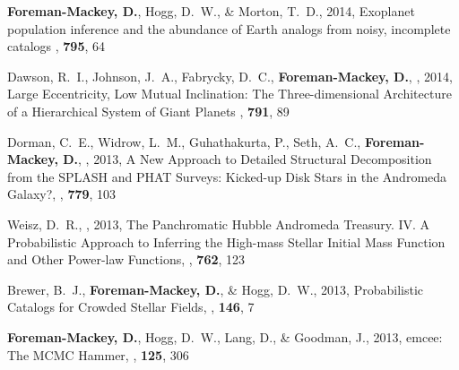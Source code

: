 \item {\bf Foreman-Mackey, D.}, Hogg, D.~W., \& Morton, T.~D., 2014,
        {Exoplanet population inference and the abundance of Earth analogs
         from noisy, incomplete catalogs}
    \apj, \textbf{795}, 64

\item Dawson, R.~I., Johnson,  J.~A., Fabrycky, D.~C.,
    {\bf Foreman-Mackey, D.}, \etal, 2014,
        {Large Eccentricity, Low Mutual Inclination: The Three-dimensional
         Architecture of a Hierarchical System of Giant Planets}
    \apj, \textbf{791}, 89

\item Dorman, C.~E., Widrow, L.~M., Guhathakurta, P., Seth, A.~C.,
    {\bf Foreman-Mackey, D.}, \etal, 2013,
        {A New Approach to Detailed Structural Decomposition from the SPLASH
         and PHAT Surveys: Kicked-up Disk Stars in the Andromeda Galaxy?},
    \apj, \textbf{779}, 103

\item Weisz, D.~R., \etal, 2013,
        {The Panchromatic Hubble Andromeda Treasury. IV. A Probabilistic
         Approach to Inferring the High-mass Stellar Initial Mass Function and
         Other Power-law Functions},
    \apj, \textbf{762}, 123

\item Brewer, B.~J., {\bf Foreman-Mackey, D.}, \& Hogg, D.~W., 2013,
        {Probabilistic Catalogs for Crowded Stellar Fields},
    \aj, \textbf{146}, 7

\item {\bf Foreman-Mackey, D.}, Hogg, D.~W., Lang, D., \& Goodman, J., 2013,
        {emcee: The MCMC Hammer},
    \pasp, \textbf{125}, 306
